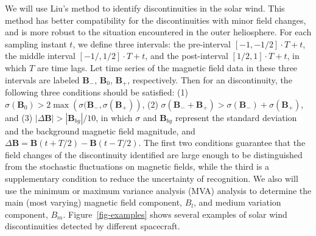 \documentclass[
]{agujournal2019}
\begin{document}
We will use Liu's \citep{liu2022a} method to identify discontinuities in the solar wind. This method has better compatibility for the discontinuities with minor field changes, and is more robust to the situation encountered in the outer heliosphere. For each sampling instant \(t\), we define three intervals: the pre-interval \([-1,-1/2]\cdot T+t\), the middle interval \([-1/,1/2]\cdot T+t\), and the post-interval \([1/2,1]\cdot T+t\), in which \(T\) are time lags. Let time series of the magnetic field data in these three intervals are labeled \({\mathbf B}_-\), \({\mathbf B}_0\), \({\mathbf B}_+\), respectively. Then for an discontinuity, the following three conditions should be satisfied: (1) \(\sigma({\mathbf B}_0)>2\max\left(\sigma({\mathbf B}_-, \sigma({\mathbf B}_+)\right)\), (2) \(\sigma\left({\mathbf B}_-+{\mathbf B}_+\right)>\sigma({\mathbf B}_-)+\sigma({\mathbf B}_+)\), and (3) \(|\Delta {\mathbf B}|>|{\mathbf B}_{bg}|/10\), in which \(\sigma\) and \({\mathbf B}_{bg}\) represent the standard deviation and the background magnetic field magnitude, and \(\Delta {\mathbf B}={\mathbf B}(t+T/2)-{\mathbf B}(t-T/2)\). The first two conditions guarantee that the field changes of the discontinuity identified are large enough to be distinguished from the stochastic fluctuations on magnetic fields, while the third is a supplementary condition to reduce the uncertainty of recognition. We also will use the minimum or maximum variance analysis (MVA) analysis \citep{sonnerupMinimumMaximumVariance1998, sonnerupMagnetopauseStructureAttitude1967} to determine the main (most varying) magnetic field component, \(B_l\), and medium variation component, \(B_m\). Figure~\ref{fig-examples} shows several examples of solar wind discontinuities detected by different spacecraft.
\end{document}
